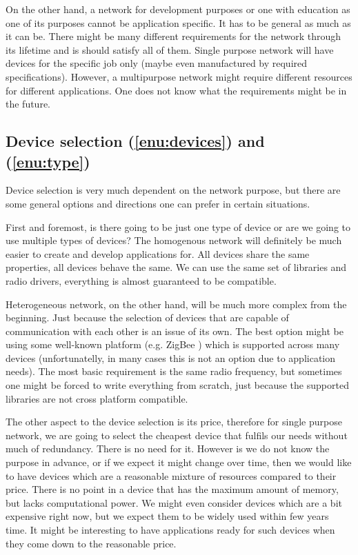 \documentclass[
  print, %
  table,   %
  nolof,     %
  nolot,     %
           oneside
]{fithesis3}
\begin{document}
  On the other hand, a network for development purposes or one with education as one of its purposes cannot be application specific. It has to be general as much as it can be. There might be many different requirements for the network through its lifetime and is should satisfy all of them. Single purpose network will have devices for the specific job only (maybe even manufactured by required specifications). However, a multipurpose network might require different resources for different applications. One does not know what the requirements might be in the future.

  \subsection{Device selection (\ref{enu:devices}) and (\ref{enu:type})}
  Device selection is very much dependent on the network purpose, but there are some general options and directions one can prefer in certain situations.

  First and foremost, is there going to be just one type of device or are we going to use multiple types of devices? The homogenous network will definitely be much easier to create and develop applications for. All devices share the same properties, all devices behave the same. We can use the same set of libraries and radio drivers, everything is almost guaranteed to be compatible.

  Heterogeneous network, on the other hand, will be much more complex from the beginning. Just because the selection of devices that are capable of communication with each other is an issue of its own. The best option might be using some well-known platform (e.g. ZigBee \cite{alliance2006zigbee}) which is supported across many devices (unfortunatelly, in many cases this is not an option due to application needs). The most basic requirement is the same radio frequency, but sometimes one might be forced to write everything from scratch, just because the supported libraries are not cross platform compatible.

  The other aspect to the device selection is its price, therefore for single purpose network, we are going to select the cheapest device that fulfils our needs without much of redundancy. There is no need for it. However is we do not know the purpose in advance, or if we expect it might change over time, then we would like to have devices which are a reasonable mixture of resources compared to their price. There is no point in a device that has the maximum amount of memory, but lacks computational power. We might even consider devices which are a bit expensive right now, but we expect them to be widely used within few years time. It might be interesting to have applications ready for such devices when they come down to the reasonable price.
\end{document}
